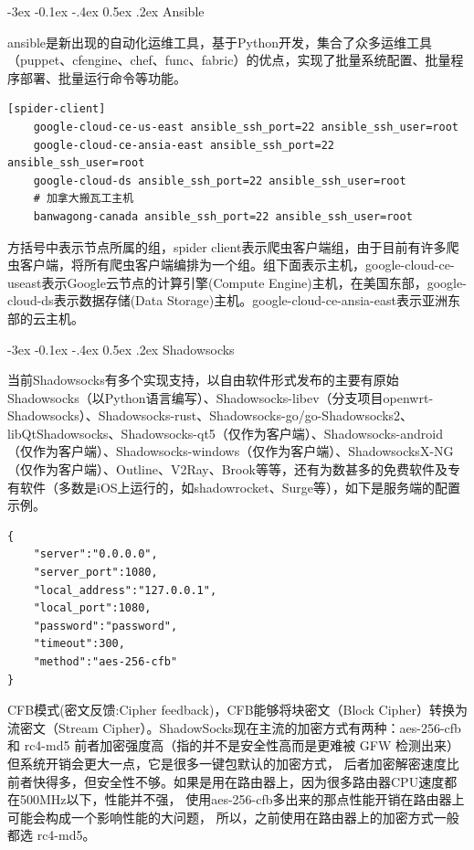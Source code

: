 \documentclass[8pt]{book}
\makeatletter
\numberwithin{dummy}{section}
\theoremstyle{ocrenumbox}
\theoremstyle{blacknumex}
\theoremstyle{blacknumbox}
\theoremstyle{ocrenum}
\renewcommand{\subsection}{\@startsection {subsection}{2}{\z@}
	{-3ex \@plus -0.1ex \@minus -.4ex}
	{0.5ex \@plus.2ex }
	{\normalfont\sffamily\bfseries}}
\makeatother
\begin{document}
\subsection{Ansible}

ansible是新出现的自动化运维工具，基于Python开发，集合了众多运维工具（puppet、cfengine、chef、func、fabric）的优点，实现了批量系统配置、批量程序部署、批量运行命令等功能。

\begin{lstlisting}
[spider-client]
	google-cloud-ce-us-east ansible_ssh_port=22 ansible_ssh_user=root
	google-cloud-ce-ansia-east ansible_ssh_port=22 ansible_ssh_user=root
	google-cloud-ds ansible_ssh_port=22 ansible_ssh_user=root
	# 加拿大搬瓦工主机
	banwagong-canada ansible_ssh_port=22 ansible_ssh_user=root
\end{lstlisting}

方括号中表示节点所属的组，spider client表示爬虫客户端组，由于目前有许多爬虫客户端，将所有爬虫客户端编排为一个组。组下面表示主机，google-cloud-ce-useast表示Google云节点的计算引擎(Compute Engine)主机，在美国东部，google-cloud-ds表示数据存储(Data Storage)主机。google-cloud-ce-ansia-east表示亚洲东部的云主机。


\subsection{Shadowsocks}

当前Shadowsocks有多个实现支持，以自由软件形式发布的主要有原始Shadowsocks（以Python语言编写）、Shadowsocks-libev（分支项目openwrt-Shadowsocks）、Shadowsocks-rust、Shadowsocks-go/go-Shadowsocks2、libQtShadowsocks、Shadowsocks-qt5（仅作为客户端）、Shadowsocks-android（仅作为客户端）、Shadowsocks-windows（仅作为客户端）、ShadowsocksX-NG（仅作为客户端）、Outline、V2Ray、Brook等等，还有为数甚多的免费软件及专有软件（多数是iOS上运行的，如shadowrocket、Surge等），如下是服务端的配置示例。

\begin{lstlisting}
{
	"server":"0.0.0.0",
	"server_port":1080,
	"local_address":"127.0.0.1",
	"local_port":1080,
	"password":"password",
	"timeout":300,
	"method":"aes-256-cfb"
}
\end{lstlisting}

CFB模式(密文反馈:Cipher feedback)，CFB能够将块密文（Block Cipher）转换为流密文（Stream Cipher）。ShadowSocks现在主流的加密方式有两种：aes-256-cfb 和 rc4-md5 前者加密强度高（指的并不是安全性高而是更难被 GFW 检测出来）
但系统开销会更大一点，它是很多一键包默认的加密方式，
后者加密解密速度比前者快得多，但安全性不够。如果是用在路由器上，因为很多路由器CPU速度都在500MHz以下，性能并不强，
使用aes-256-cfb多出来的那点性能开销在路由器上可能会构成一个影响性能的大问题，
所以，之前使用在路由器上的加密方式一般都选 rc4-md5。
\end{document}
